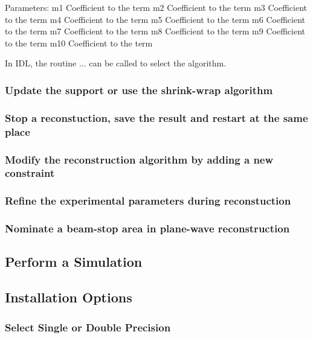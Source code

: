 \documentclass[]{cxs-software}
\begin{document}
Parameters:
m1 	Coefficient to the  term
m2 	Coefficient to the  term
m3 	Coefficient to the  term
m4 	Coefficient to the  term
m5 	Coefficient to the  term
m6 	Coefficient to the  term
m7 	Coefficient to the  term
m8 	Coefficient to the  term
m9 	Coefficient to the  term
m10 	Coefficient to the  term




In IDL, the routine ... can be called to select the algorithm.


\subsubsection{Update the support or use the shrink-wrap algorithm}

\subsubsection{Stop a reconstuction, save the result and restart at the same place}

\subsubsection{Modify the reconstruction algorithm by adding a new constraint}

\subsubsection{Refine the experimental parameters during reconstuction}

\subsubsection{Nominate a beam-stop area in plane-wave reconstruction}



\subsection{Perform a Simulation}





\subsection{Installation Options}

\subsubsection{Select Single or Double Precision}
\end{document}

